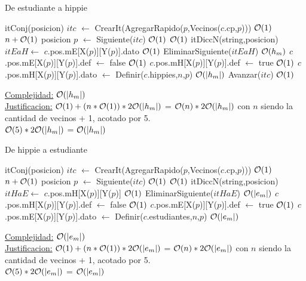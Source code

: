 \begin{Algoritmos}
\begin{algorithm}[H]
\caption{De estudiante a hippie}
\begin{algorithmic}[1]
	\State itConj(posicion) $itc$ $\gets$ CrearIt(AgregarRapido($p$,Vecinos($c$.cp,$p$))) \Comment $\mathcal{O}(1)$
	 \Comment $n+\mathcal{O}(1)$
	\State posicion $p$ $\gets$ Siguiente($itc$) \Comment $\mathcal{O}(1)$
		 \Comment $\mathcal{O}(1)$ 
			\State itDiccN(string,posicion) $itEaH \gets$ $c$.pos.mE[X($p$)][Y($p$)].dato \Comment $\mathcal{O}(1)$
			\State EliminarSiguiente($itEaH$) \Comment $\mathcal{O}(h_m)$
			\State $c$.pos.mE[X($p$)][Y($p$)].def $\gets$ false \Comment $\mathcal{O}(1)$
			\State $c$.pos.mH[X($p$)][Y($p$)].def $\gets$ true \Comment $\mathcal{O}(1)$
			\State $c$.pos.mH[X($p$)][Y($p$)].dato $\gets$ Definir($c$.hippies,$n$,$p$) \Comment $\mathcal{O}(|h_m|)$
		\EndIf
		\State Avanzar($itc$) \Comment $\mathcal{O}(1)$
	\EndWhile
	\EndProcedure
\end{algorithmic}
\underline{Complejidad:} $\mathcal{O}(|h_m|)$\\
\underline{Justificacion:} $\mathcal{O}(1) + (n*\mathcal{O}(1))* 2\mathcal{O}(|h_m|)$ = $\mathcal{O}(n)*2\mathcal{O}(|h_m|)$ con $n$ siendo la cantidad de vecinos + 1, acotado por 5. \\
$\mathcal{O}(5)*2\mathcal{O}(|h_m|)$ = $\mathcal{O}(|h_m|)$
\end{algorithm}

\begin{algorithm}[H]
\caption{De hippie a estudiante}
\begin{algorithmic}[1]
	\State itConj(posicion) $itc$ $\gets$ CrearIt(AgregarRapido($p$,Vecinos($c$.cp,$p$))) \Comment $\mathcal{O}(1)$
	 \Comment $n + \mathcal{O}(1)$
	\State posicion $p$ $\gets$ Siguiente($itc$) \Comment $\mathcal{O}(1)$
	 \Comment $\mathcal{O}(1)$
		\State itDiccN(string,posicion) $itHaE \gets$ $c$.pos.mH[X($p$)][Y($p$)] \Comment $\mathcal{O}(1)$
		\State EliminarSiguiente($itHaE$) \Comment $\mathcal{O}(|e_m|)$
		\State $c$.pos.mH[X($p$)][Y($p$)].def $\gets$ false \Comment $\mathcal{O}(1)$
		\State $c$.pos.mE[X($p$)][Y($p$)].def $\gets$ true \Comment $\mathcal{O}(1)$
		\State $c$.pos.mE[X($p$)][Y($p$)].dato $\gets$ Definir($c$.estudiantes,$n$,$p$) \Comment $\mathcal{O}(|e_m|)$
	\EndIf
	\EndWhile
	\EndProcedure
\end{algorithmic}
\underline{Complejidad:} $\mathcal{O}(|e_m|)$\\
\underline{Justificacion:} $\mathcal{O}(1) + (n*\mathcal{O}(1))* 2\mathcal{O}(|e_m|)$ = $\mathcal{O}(n)*2\mathcal{O}(|e_m|)$ con $n$ siendo la cantidad de vecinos + 1, acotado por 5. \\
$\mathcal{O}(5)*2\mathcal{O}(|e_m|)$ = $\mathcal{O}(|e_m|)$
\end{algorithm}




\end{Algoritmos}
